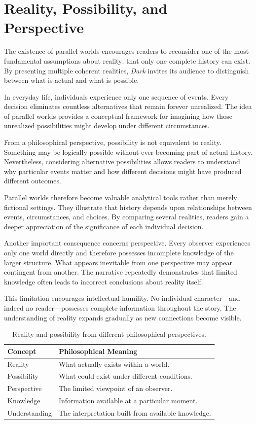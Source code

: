 \documentclass[12pt,oneside,openany]{book}
\begin{document}
\section{Reality, Possibility, and Perspective}

The existence of parallel worlds encourages readers to reconsider one of the
most fundamental assumptions about reality: that only one complete history can
exist. By presenting multiple coherent realities, \textit{Dark} invites its
audience to distinguish between what is actual and what is possible.

In everyday life, individuals experience only one sequence of events. Every
decision eliminates countless alternatives that remain forever unrealized. The
idea of parallel worlds provides a conceptual framework for imagining how those
unrealized possibilities might develop under different circumstances.

From a philosophical perspective, possibility is not equivalent to reality.
Something may be logically possible without ever becoming part of actual
history. Nevertheless, considering alternative possibilities allows readers to
understand why particular events matter and how different decisions might have
produced different outcomes.

Parallel worlds therefore become valuable analytical tools rather than merely
fictional settings. They illustrate that history depends upon relationships
between events, circumstances, and choices. By comparing several realities,
readers gain a deeper appreciation of the significance of each individual
decision.

Another important consequence concerns perspective. Every observer experiences
only one world directly and therefore possesses incomplete knowledge of the
larger structure. What appears inevitable from one perspective may appear
contingent from another. The narrative repeatedly demonstrates that limited
knowledge often leads to incorrect conclusions about reality itself.

This limitation encourages intellectual humility. No individual character—and
indeed no reader—possesses complete information throughout the story. The
understanding of reality expands gradually as new connections become visible.

\begin{table}[H]
\centering
\begin{tabular}{|p{4.2cm}|p{7.8cm}|}
\hline
\textbf{Concept} & \textbf{Philosophical Meaning}\\
\hline
Reality & What actually exists within a world.\\
\hline
Possibility & What could exist under different conditions.\\
\hline
Perspective & The limited viewpoint of an observer.\\
\hline
Knowledge & Information available at a particular moment.\\
\hline
Understanding & The interpretation built from available knowledge.\\
\hline
\end{tabular}
\caption{Reality and possibility from different philosophical perspectives.}
\end{table}
\end{document}
